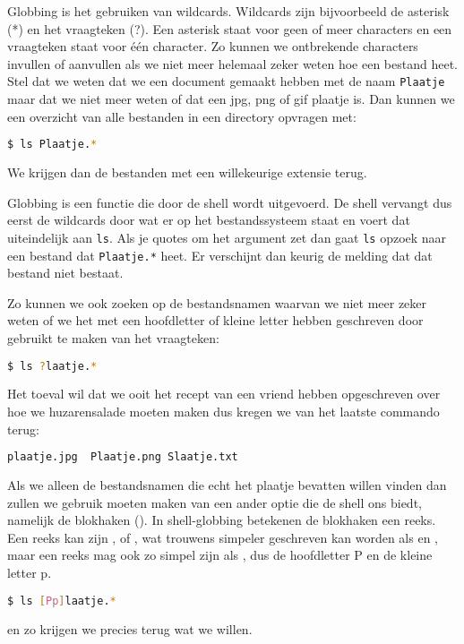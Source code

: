 Globbing is het gebruiken van wildcards. Wildcards zijn bijvoorbeeld de asterisk (*) en het vraagteken (?). Een asterisk staat voor geen of meer characters en een vraagteken staat voor \'{e}\'{e}n character. Zo kunnen we ontbrekende characters invullen of aanvullen als we niet meer helemaal zeker weten hoe een bestand heet. Stel dat we weten dat we een document gemaakt hebben met de naam \texttt{Plaatje} maar dat we niet meer weten of dat een jpg, png of gif plaatje is. Dan kunnen we een overzicht van alle bestanden in een directory opvragen met:
\begin{lstlisting}[language=bash]
$ ls Plaatje.*
\end{lstlisting}
We krijgen dan de bestanden met een willekeurige extensie terug.

Globbing is een functie die door de shell wordt uitgevoerd. De shell vervangt dus eerst de wildcards door wat er op het bestandssysteem staat en voert dat uiteindelijk aan \texttt{ls}. Als je quotes om het argument zet dan gaat \texttt{ls} opzoek naar een bestand dat \verb|Plaatje.*| heet. Er verschijnt dan keurig de melding dat dat bestand niet bestaat.

Zo kunnen we ook zoeken op de bestandsnamen waarvan we niet meer zeker weten of we het met een hoofdletter of kleine letter hebben geschreven door gebruikt te maken van het vraagteken:
\begin{lstlisting}[language=bash]
$ ls ?laatje.*
\end{lstlisting}

Het toeval wil dat we ooit het recept van een vriend hebben opgeschreven over hoe we huzarensalade moeten maken dus kregen we van het laatste commando terug:
\begin{lstlisting}[language=bash]
plaatje.jpg  Plaatje.png Slaatje.txt
\end{lstlisting}

Als we alleen de bestandsnamen die echt het plaatje bevatten willen vinden dan zullen we gebruik moeten maken van een ander optie die de shell ons biedt, namelijk de blokhaken (\big[\big]). In shell-globbing betekenen de blokhaken een reeks. Een reeks kan zijn \big[1234567890\big], of , wat trouwens simpeler geschreven kan worden als \big[0-9\big] en \big[a-g\big], maar een reeks mag ook zo simpel zijn als \big[pP\big], dus de hoofdletter P en de kleine letter p.
\begin{lstlisting}[language=bash]
$ ls [Pp]laatje.*
\end{lstlisting}
en zo krijgen we precies terug wat we willen.

